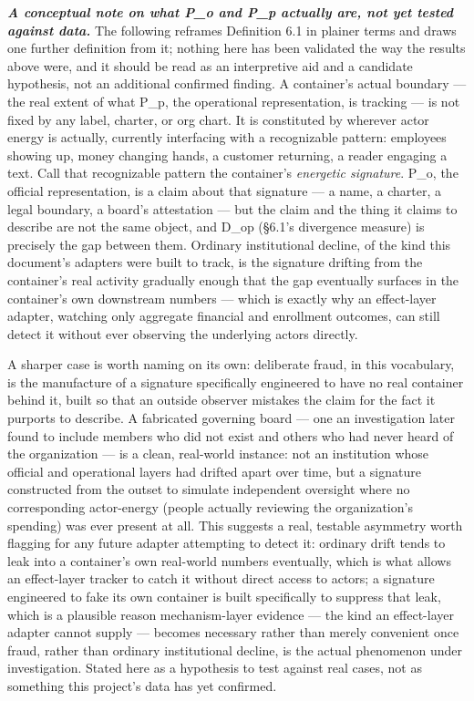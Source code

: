 \documentclass[
]{article}
\begin{document}
\emph{\textbf{A conceptual note on what P\_o and P\_p actually are, not
yet tested against data.}} The following reframes Definition 6.1 in
plainer terms and draws one further definition from it; nothing here has
been validated the way the results above were, and it should be read as
an interpretive aid and a candidate hypothesis, not an additional
confirmed finding. A container's actual boundary --- the real extent of
what P\_p, the operational representation, is tracking --- is not fixed
by any label, charter, or org chart. It is constituted by wherever actor
energy is actually, currently interfacing with a recognizable pattern:
employees showing up, money changing hands, a customer returning, a
reader engaging a text. Call that recognizable pattern the container's
\emph{energetic signature}. P\_o, the official representation, is a
claim about that signature --- a name, a charter, a legal boundary, a
board's attestation --- but the claim and the thing it claims to
describe are not the same object, and D\_op (§6.1's divergence measure)
is precisely the gap between them. Ordinary institutional decline, of
the kind this document's adapters were built to track, is the signature
drifting from the container's real activity gradually enough that the
gap eventually surfaces in the container's own downstream numbers ---
which is exactly why an effect-layer adapter, watching only aggregate
financial and enrollment outcomes, can still detect it without ever
observing the underlying actors directly.

A sharper case is worth naming on its own: deliberate fraud, in this
vocabulary, is the manufacture of a signature specifically engineered to
have no real container behind it, built so that an outside observer
mistakes the claim for the fact it purports to describe. A fabricated
governing board --- one an investigation later found to include members
who did not exist and others who had never heard of the organization ---
is a clean, real-world instance: not an institution whose official and
operational layers had drifted apart over time, but a signature
constructed from the outset to simulate independent oversight where no
corresponding actor-energy (people actually reviewing the organization's
spending) was ever present at all. This suggests a real, testable
asymmetry worth flagging for any future adapter attempting to detect it:
ordinary drift tends to leak into a container's own real-world numbers
eventually, which is what allows an effect-layer tracker to catch it
without direct access to actors; a signature engineered to fake its own
container is built specifically to suppress that leak, which is a
plausible reason mechanism-layer evidence --- the kind an effect-layer
adapter cannot supply --- becomes necessary rather than merely
convenient once fraud, rather than ordinary institutional decline, is
the actual phenomenon under investigation. Stated here as a hypothesis
to test against real cases, not as something this project's data has yet
confirmed.
\end{document}
